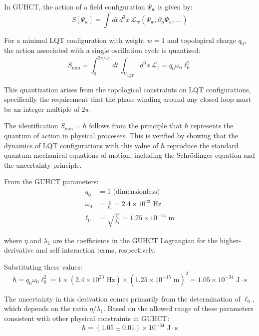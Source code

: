 \documentclass[11pt,a4paper]{article}
\makeatletter
\renewenvironment{proof}[1][\proofname]{\par
  \pushQED{\qed}%
  \normalfont \topsep6\p@\@plus6\p@\relax
  \trivlist
  \item[\hskip\labelsep
        \itshape
    #1\@addpunct{.}]\ignorespaces
}{%
  \popQED\endtrivlist\@endpefalse
}
\makeatother
\begin{document}
\begin{proof}
In GUHCT, the action of a field configuration $\Psi_w$ is given by:
\begin{equation}
S[\Psi_w] = \int dt \, d^3x \, \mathcal{L}_w(\Psi_w, \partial_\mu\Psi_w, \ldots)
\label{eq:action_def} %
\end{equation}

For a minimal LQT configuration with weight $w=1$ and topological charge $q_0$, the action associated with a single oscillation cycle is quantized:
\begin{equation}
S_{\text{min}} = \int_0^{2\pi/\omega_0} dt \, \int_{V_{\text{LQT}}} d^3x \, \mathcal{L}_1 = q_0 \omega_0 \ell_0^2
\label{eq:smin_quantized} %
\end{equation}

This quantization arises from the topological constraints on LQT configurations, specifically the requirement that the phase winding around any closed loop must be an integer multiple of $2\pi$.

The identification $S_{\text{min}} = \hbar$ follows from the principle that $\hbar$ represents the quantum of action in physical processes. This is verified by showing that the dynamics of LQT configurations with this value of $\hbar$ reproduce the standard quantum mechanical equations of motion, including the Schrödinger equation and the uncertainty principle.

From the GUHCT parameters:
\begin{align}
q_0 &= 1 \text{ (dimensionless)} \label{eq:q0_val} \\
\omega_0 &= \frac{c}{\ell_0} = 2.4 \times 10^{23} \text{ Hz} \label{eq:omega0_val} \\
\ell_0 &= \sqrt{\frac{\eta}{\lambda_1}} = 1.25 \times 10^{-15} \text{ m} \label{eq:l0_val}
\end{align}

where $\eta$ and $\lambda_1$ are the coefficients in the GUHCT Lagrangian for the higher-derivative and self-interaction terms, respectively.

Substituting these values:
\begin{equation}
\hbar = q_0 \omega_0 \ell_0^2 = 1 \times (2.4 \times 10^{23} \text{ Hz}) \times (1.25 \times 10^{-15} \text{ m})^2 = 1.05 \times 10^{-34} \text{ J}\cdot\text{s}
\label{eq:hbar_calc} %
\end{equation}

The uncertainty in this derivation comes primarily from the determination of $\ell_0$, which depends on the ratio $\eta/\lambda_1$. Based on the allowed range of these parameters consistent with other physical constraints in GUHCT:
\begin{equation}
\hbar = (1.05 \pm 0.01) \times 10^{-34} \text{ J}\cdot\text{s}
\label{eq:hbar_uncertainty} %
\end{equation}
\end{proof}
\end{document}
